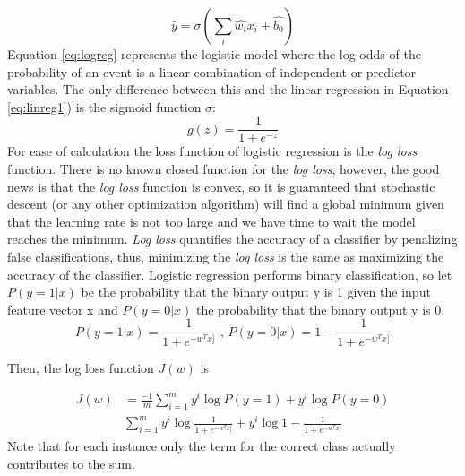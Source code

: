 \documentclass[11pt]{article}
\theoremstyle{definition}
\theoremstyle{remark}
\begin{document}
\begin{equation}
\hat{y} = \sigma(\sum_i \hat{w_i}x_i +\hat{b_0})
\label{eq:logreg}
\end{equation}
Equation \ref{eq:logreg} represents the logistic model where the log-odds of the probability of an event is a linear combination of independent or predictor variables. The only difference between this and the linear regression in Equation \ref{eq:linreg1}) is the sigmoid function $\sigma$:
\begin{equation}
g(z) = \frac{1}{1+e^{-z}}
\label{eq:sigmoid}
\end{equation}
For ease of calculation the loss function of logistic regression is the \emph{log loss} function. There is no known closed function for the \emph{log loss}, however, the good news is that the \emph{log loss} function is convex, so it is guaranteed that stochastic descent (or any other optimization algorithm) will find a global minimum given that the learning rate is not too large and we have time to wait the model reaches the minimum. \emph{Log loss} quantifies the accuracy of a classifier by penalizing false classifications, thus, minimizing the \emph{log loss} is the same as maximizing the accuracy of the classifier.
Logistic regression performs binary classification, so let $P(y=1|x)$ be the probability that the binary output y is 1 given the input feature vector x and $P(y=0|x)$ the probability that the binary output y is 0. 
\begin{equation}
P(y=1|x) = \frac{1}{1+e^{-w^{T}x]}} \textit{ , } P(y=0|x) = 1 - \frac{1}{1+e^{-w^{T}x]}}
\label{eq:sigmoid2}
\end{equation}

Then, the log loss function $J(w)$ is 

\begin{equation}
\begin{split}
J(w) &= \frac{-1}{m}\sum_{i=1}^{m} y^i\log P(y=1) + y^i \log P(y=0) \\
&  \sum_{i=1}^{m} y^i \log	\frac{1}{1+e^{-w^{T}x]}} + y^i \log 1 - \frac{1}{1+e^{-w^{T}x]}}
\end{split}
\label{eq:sigmoid3}
\end{equation}
Note that for each instance only the term for the correct class actually contributes to the sum.
\end{document}
